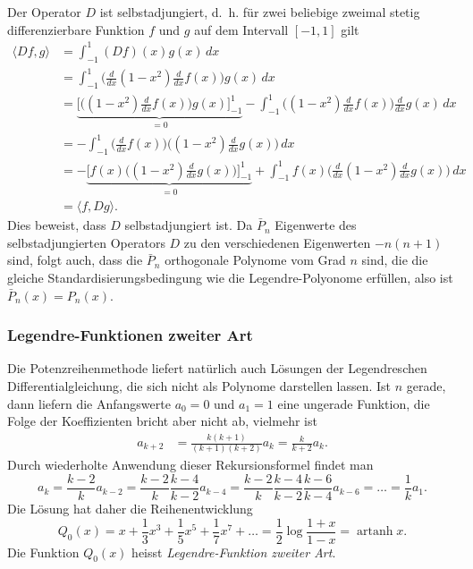 Der Operator $D$ ist selbstadjungiert, d.~h.
für zwei beliebige zweimal stetig differenzierbare Funktion $f$ und $g$
auf dem Intervall $[-1,1]$ gilt
\begin{align*}
\langle Df,g\rangle
&=
\int_{-1}^1 (Df)(x) g(x) \,dx
\\
&=
\int_{-1}^1
\biggl(\frac{d}{dx} (1-x^2)\frac{d}{dx}f(x)\biggr) g(x)
\,dx
\\
&=
\underbrace{
\biggl[
\biggl((1-x^2)\frac{d}{dx}f(x)\biggr) g(x)
\biggr]_{-1}^1
}_{\displaystyle = 0}
-
\int_{-1}^1
\biggl((1-x^2)\frac{d}{dx}f(x)\biggr) \frac{d}{dx}g(x)
\,dx
\\
&=
-
\int_{-1}^1
\biggl(\frac{d}{dx}f(x)\biggr) \biggl((1-x^2)\frac{d}{dx}g(x)\biggr)
\,dx
\\
&=
-
\underbrace{
\biggl[
f(x) \biggl((1-x^2)\frac{d}{dx}g(x)\biggr)
\biggr]_{-1}^1}_{\displaystyle = 0}
+
\int_{-1}^1
f(x) \biggl(\frac{d}{dx}(1-x^2)\frac{d}{dx}g(x)\biggr)
\,dx
\\
&=
\langle f,Dg\rangle.
\end{align*}
Dies beweist, dass $D$ selbstadjungiert ist.
Da $\bar{P}_n$ Eigenwerte des selbstadjungierten Operators $D$ zu
den verschiedenen Eigenwerten $-n(n+1)$ sind, folgt auch, dass
die $\bar{P}_n$ orthogonale Polynome vom Grad $n$ sind, die die 
gleiche Standardisierungsbedingung wie die Legendre-Polyonome
erfüllen, also ist $\bar{P}_n(x)=P_n(x)$.

%
%
\subsubsection{Legendre-Funktionen zweiter Art}
%
Die Potenzreihenmethode liefert natürlich auch Lösungen der
Legendreschen Differentialgleichung, die sich nicht als Polynome
darstellen lassen.
Ist $n$ gerade, dann liefern die Anfangswerte $a_0=0$ und $a_1=1$ 
eine ungerade Funktion, die Folge der Koeffizienten bricht
aber nicht ab, vielmehr ist
\begin{align*}
a_{k+2}
&=
\frac{k(k+1)}{(k+1)(k+2)}a_k
=
\frac{k}{k+2}a_k.
\end{align*}
Durch wiederholte Anwendung dieser Rekursionsformel findet man
\[
a_{k}
=
\frac{k-2}{k}a_{k-2}
=
\frac{k-2}{k}\frac{k-4}{k-2}a_{k-4}
=
\frac{k-2}{k}\frac{k-4}{k-2}\frac{k-6}{k-4}a_{k-6}
=
\dots
=
\frac{1}{k}a_1.
\]
Die Lösung hat daher die Reihenentwicklung
\[
Q_0(x) = x+\frac13x^3 + \frac15x^5 + \frac17x^7+\dots
=
\frac12\log \frac{1+x}{1-x}
=
\operatorname{artanh}x.
\]
Die Funktion $Q_0(x)$ heisst {\em Legendre-Funktion zweiter Art}.


